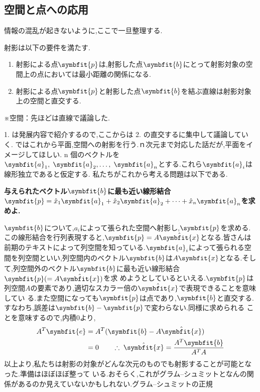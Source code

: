 \subsection{空間と点への応用}
情報の混乱が起きないように,ここで一旦整理する.
\begin{framed}
射影は以下の要件を満たす.
\begin{enumerate}
    \item 射影による点$\symbfit{p}$は,射影した点$\symbfit{b}$にとって射影対象の空間上の点においては最小距離の関係になる.
    \item 射影による点$\symbfit{p}$と射影した点$\symbfit{b}$を結ぶ直線は射影対象上の空間と直交する.
\end{enumerate}
※空間：先ほどは直線で議論した.
\end{framed}
1. は発展内容で紹介するので,ここからは 2. の直交するに集中して議論していく.
ではこれから平面,空間への射影を行う.ｎ次元まで対応した話だが,平面をイメージしてほしい.
n 個のベクトルを $\symbfit{a}_1,\;\symbfit{a}_2,\dots,\;\symbfit{a}_n$とする.これら$\symbfit{a}_i$は線形独立であると仮定する.
私たちがこれから考える問題は以下である.
\begin{center}
    \textbf{与えられたベクトル$\symbfit{b}$に最も近い線形結合$\symbfit{p}=\hat{x}_1\symbfit{a}_1+\hat{x}_2\symbfit{a}_2+\dots+\hat{x}_n\symbfit{a}_n$を求めよ.}
\end{center}
$\symbfit{b}$について,$a_i$によって張られた空間へ射影し,$\symbfit{p}$を求める.
この線形結合を行列表現すると,$\symbfit{p}=A\hat{\symbfit{x}}$となる.皆さんは前期のテキストによって列空間を知っている.$\symbfit{a}_i$によって張られる空間を列空間といい,列空間$\dot{内}$のベクトル$\symbfit{b}$は$A\symbfit{x}$となる.そして,列空間$\dot{外}$のベクトル$\symbfit{b}$に最も近い線形結合$\symbfit{p}(=A\hat{\symbfit{x}})$を求
めようとしているといえる.$\symbfit{p}$は列空間$A$の要素であり,適切なスカラー倍の$\hat{\symbfit{x}}$で表現できることを意味してい
る.また空間になっても$\symbfit{p}$は点であり,$\symbfit{b}$と直交する.すなわち,誤差は$\symbfit{b}-\symbfit{p}$で変わらない.同様に求められる
ことを意味するので,内積0より,
\begin{align*}\displaystyle
    A^T\symbfit{e} &= A^T(\symbfit{b}-A\hat{\symbfit{x}})\\
                   &= 0 \qquad \therefore\;\hat{\symbfit{x}}=\frac{A^T\symbfit{b}}{A^TA}
\end{align*}
以上より,私たちは射影の対象がどんな次元のものでも射影することが可能となった.準備はほぼほぼ整って
いる.おそらく,これがグラム--シュミットとなんの関係があるのか見えていないかもしれない.グラム--シュミットの正規
